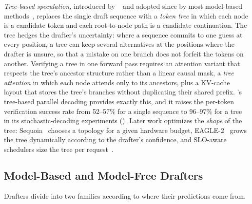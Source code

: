 \emph{Tree-based speculation}, introduced by \SpecInfer~\cite{specinfer} and adopted since by most model-based methods~\cite{cai2024medusasimplellminference,li2024eagle,eagle2,sequoia}, replaces the single draft sequence with a \emph{token tree} in which each node is a candidate token and each root-to-node path is a candidate continuation.
The tree hedges the drafter's uncertainty: where a sequence commits to one guess at every position, a tree can keep several alternatives at the positions where the drafter is unsure, so that a mistake on one branch does not forfeit the tokens on another.
Verifying a tree in one forward pass requires an attention variant that respects the tree's ancestor structure rather than a linear causal mask, a \emph{tree attention} in which each node attends only to its ancestors, plus a KV-cache layout that stores the tree's branches without duplicating their shared prefix.
\SpecInfer's tree-based parallel decoding provides exactly this, and it raises the per-token verification success rate from 52--57\% for a single sequence to 96--97\% for a tree in its stochastic-decoding experiments ().
Later work optimizes the \emph{shape} of the tree: Sequoia~\cite{sequoia} chooses a topology for a given hardware budget, EAGLE-2~\cite{eagle2} grows the tree dynamically according to the drafter's confidence, and SLO-aware schedulers size the tree per request~\cite{adaserve}.

\subsection{Model-Based and Model-Free Drafters}
\label{background:subsec:drafters}

Drafters divide into two families according to where their predictions come from.

